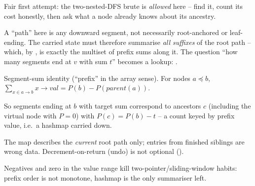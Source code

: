 \begin{attemptgate}
Fair first attempt: the two-nested-DFS brute is \emph{allowed} here -- find it,
count its cost honestly, then ask what a node already knows about its ancestry.
\end{attemptgate}

A ``path'' here is any downward segment, not necessarily root-anchored or
leaf-ending. The carried state must therefore summarise \emph{all suffixes} of
the root path -- which, by , is exactly the multiset of
prefix sums along it. The question ``how many segments end at $v$ with sum $t$''
becomes a lookup: .

\begin{observation}
Segment-sum identity (``prefix'' in the array sense). For nodes $a \preceq b$,
$\sum_{x \in a \to b} x\to\mathit{val} = P(b) - P(\mathit{parent}(a))$.
\end{observation}
\begin{observation}
So segments ending at $b$ with target sum correspond to ancestors $c$ (including
the virtual node with $P=0$) with $P(c) = P(b) - t$ -- a count keyed by prefix
value, i.e.\ a hashmap carried down.
\end{observation}
\begin{observation}
The map describes the \emph{current} root path only; entries from finished
siblings are wrong data. Decrement-on-return (undo) is not optional
().
\end{observation}
\begin{observation}
Negatives and zero in the value range kill two-pointer/sliding-window habits:
prefix order is not monotone, hashmap is the only summariser left.
\end{observation}

